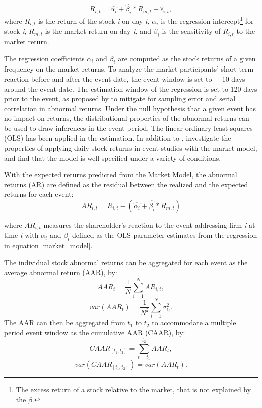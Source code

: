 \begin{equation} \label{market_model}
    R_{i,t} = \hat{\alpha_i} + \hat{\beta_i} * R_{m,t} + \hat{\epsilon}_{i,t},
\end{equation}
 where $R_{i,t}$ is the return of the stock \textit{i} on day \textit{t}, $\alpha_i$ is the regression intercept\footnote{The excess return of a stock relative to the market, that is not explained by the $\beta$.} for stock \textit{i}, $R_{m,t}$ is the market return on day \textit{t}, and
 $\beta_i$ is the sensitivity of $R_{i,t}$ to the market return.  

 The regression coefficients $\alpha_i$ and $\beta_i$ are computed as the stock returns of a given frequency on the market returns. To analyze the market participants' short-term reaction before and after the event date, the event window is set to +-10 days around the event date. The estimation window of the regression is set to 120 days prior to the event, as proposed by \cite{Event_studies} to mitigate for sampling error and serial correlation in abnormal returns. Under the null hypothesis that a given event has no impact on returns, the distributional properties of the abnormal returns can be used to draw inferences in the event period. 
 The linear ordinary least squares (OLS) has been applied in the estimation. In addition to \cite{Event_studies},\cite{brown1985using} investigate the properties of applying daily stock returns in event studies with the market model, and find that the model is well-specified under a variety of conditions. 

 With the expected returns predicted from the Market Model, the abnormal returns (AR) are defined as the residual between the realized and the expected returns for each event:
 \begin{equation}
    AR_{i,t} = R_{i,t} - (\hat{\alpha_i} + \hat{\beta_i} * R_{m,t})
 \end{equation}

 where $AR_{i,t}$ measures the shareholder's reaction to the event addressing firm \textit{i} at time \textit{t}  with $\alpha_i$ and $\beta_i$ defined as the OLS-parameter estimates from the regression in equation \ref{market_model}.
  
 The individual stock abnormal returns can be aggregated for each event as the average abnormal return (AAR), by:  
 \begin{equation}
 AAR_t = \frac{1}{N} \sum_{i=1} ^N AR_{i,t},
 \end{equation}
 \begin{equation}
 var(AAR_{t}) = \frac{1}{N^2} \sum_{i=1} ^N \sigma_{\epsilon_i} ^2.
 \end{equation}
 The AAR can then be aggregated from $t_1$ to $t_2$ to accommodate a multiple period event window as the cumulative AAR (CAAR), by:
 \begin{equation}
 CAAR_{[t_1,t_2]} = \sum_{t = t_1 } ^{t_2} AAR_{t},
 \end{equation}
 \begin{equation}
 var(CAAR_{[t_1,t_2]}) = var(AAR_t).
 \end{equation}
 
